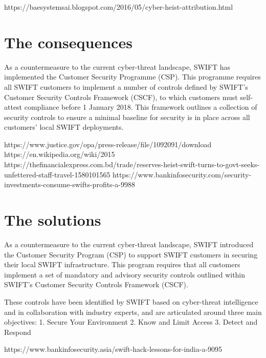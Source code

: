 \documentclass[12pt]{article}
\begin{document}
        https://baesystemsai.blogspot.com/2016/05/cyber-heist-attribution.html
        
\section{The consequences}
        
        As a countermeasure to the current cyber-threat landscape, SWIFT has implemented the Customer Security Programme (CSP). This programme requires all SWIFT customers to implement a number of controls defined by SWIFT’s Customer Security Controls Framework (CSCF), to which customers must self-attest compliance before 1 January 2018. This framework outlines a collection of security controls to ensure a minimal baseline for security is in place across all customers’ local SWIFT deployments.
        
        https://www.justice.gov/opa/press-release/file/1092091/download
        https://en.wikipedia.org/wiki/2015%
        https://thefinancialexpress.com.bd/trade/reserves-heist-swift-turns-to-govt-seeks-unfettered-staff-travel-1580101565
        https://www.bankinfosecurity.com/security-investments-consume-swifts-profits-a-9988
        
\section{The solutions}
        
        As a countermeasure to the current cyber-threat landscape, SWIFT introduced the Customer Security Program (CSP) to support SWIFT customers in securing their local SWIFT infrastructure. This program requires that all customers implement a set of mandatory and advisory security controls outlined within SWIFT’s Customer Security Controls Framework (CSCF).
        
        These controls have been identified by SWIFT based on cyber-threat intelligence and in collaboration with industry experts, and are articulated around three main objectives:
        1. Secure Your Environment 
        2. Know and Limit Access 
        3. Detect and Respond
        
        https://www.bankinfosecurity.asia/swift-hack-lessons-for-india-a-9095
        

\begin{flushright}
 \end{flushright}
\newpage
\printbibliography[heading=bibintoc]
\end{document}
